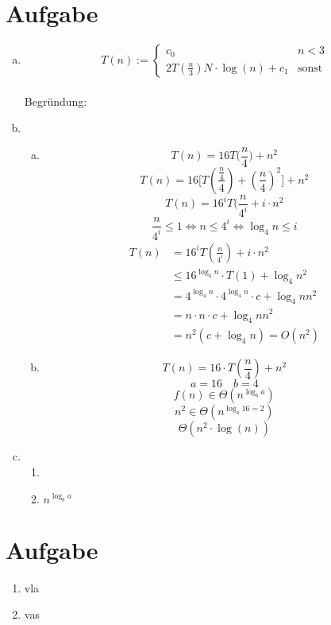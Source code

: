 \documentclass[a4paper,fleqn]{scrartcl}
\begin{document}
\section{Aufgabe}
\begin{enumerate}[a)]
 \item
 \[ T(n):= \begin{cases}
    c_0 & n < 3 \\ 
    2T\left( \frac{n}{3} \right) N \cdot \log(n) + c_1 & \text{sonst}
   \end{cases}\] \\
   Begründung: \\
 \item
 \begin{enumerate}[(a)]
  \item \[ T(n) = 16 T\Big(\frac n 4\Big) + n^2 \]
\[ T(n) = 16 \Big[T(\frac {\frac n 4} 4) + (\frac n 4)^2 \Big] + n^2\]
\[ T(n) = 16^i T(\frac n {4^i} + i \cdot n^2\]
\[ \frac n {4^i} \leq 1 \Leftrightarrow n \leq 4^i \Leftrightarrow \log_4 n \leq i \]
\begin{align*}
T(n) &= 16^i T(\frac n {4^i}) + i \cdot n^2\\
     &\leq 16^{\log_4 n} \cdot T(1) + \log_4 n^2\\
     &= 4^{\log_4 n} \cdot 4^{\log_4 n} \cdot c + \log_4 n n^2\\
     &= n \cdot n \cdot c + \log_4 n n^2\\
     &= n^2 (c + \log_4 n) = O(n^2)
\end{align*}
  \item \[ T(n) = 16 \cdot T\left( \frac{n}{4} \right) + n^2 \]
\[ a= 16 \quad b = 4 \]
\[ f(n) \in \Theta \left( n^{\log_b a} \right) \]
\[ n^2 \in \Theta \left( n^{\log_4 16=2} \right) \]
\[ \Theta \left(n^2 \cdot \log(n)\right) \]
 \end{enumerate}

 \item 
 \begin{enumerate}[1.]
  \item 
  \item $ n^{\log_b a} $
 \end{enumerate}

\end{enumerate}
 
\section{Aufgabe}
\begin{enumerate}[1.]
\item vla
\item vas 
\end{enumerate}
\end{document}
